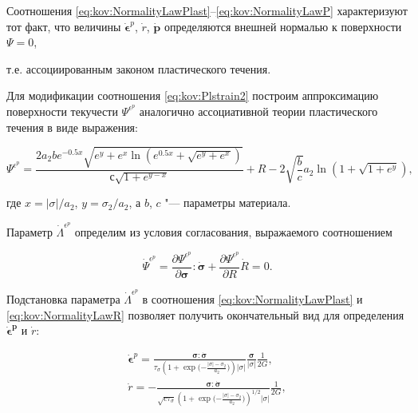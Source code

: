 Соотношения  \eqref{eq:kov:NormalityLawPlast}--\eqref{eq:kov:NormalityLawP} характеризуют тот факт, что величины $\boldsymbol{\dot{\epsilon}}^{p}$, $\dot{r}$, $\dot{\boldsymbol{p}}$  определяются внешней нормалью к поверхности $\Psi=0$,

т.е. ассоциированным законом пластического течения.



Для модификации соотношения \eqref{eq:kov:Plstrain2} построим аппроксимацию поверхности текучести $\Psi^{\epsilon^p}$ аналогично ассоциативной теории пластического течения \cite{kostina:bib:MurakamiB} в виде выражения:

$$

\Psi^{\epsilon^p}=\frac{2{a}_{2}b{e}^{-0.5x}\sqrt{{e}^{y}+{e}^{x}\ln \left({e}^{0.5x}+\sqrt{{e}^{y}+{e}^{x}} \right)}}{с\sqrt{1+{e}^{y-x}}}+R-2\sqrt{\frac{b}{c}}{a}_{2}\ln \left(1+\sqrt{1+{e}^{y}} \right), \label{eq:kov:Psiep}

$$

где $x= |  \sigma  |  /{a}_{2}$, $y=\sigma_{2}/{a}_{2}$, а $b$, $c$ "--- параметры материала.



Параметр $\dot{\Lambda}^{\epsilon^p}$ определим из условия согласования, выражаемого соотношением

$$

\dot{\Psi}^{\epsilon^p}=\frac{\partial{\Psi^{\epsilon^p}}}{\partial{\boldsymbol{\sigma}}}:\dot{\boldsymbol{\sigma}}+\frac{\partial \Psi^{\epsilon^p}}{\partial{R}}\dot{R}=0.

$$

Подстановка параметра $\dot{\Lambda}^{\epsilon^p}$ в соотношения \eqref{eq:kov:NormalityLawPlast} и \eqref{eq:kov:NormalityLawR} позволяет получить окончательный вид для определения $\boldsymbol{\dot{\epsilon}^{p}}$ и $\dot{r}$:

\begin{gather}

\boldsymbol{\dot{\epsilon}}^{p}= \frac{\boldsymbol{\sigma}:\dot{\boldsymbol{\sigma}}}

{\tau_{\sigma} \left(1+\exp\bigl({-\frac{ | \sigma | -\sigma_{2}}{a_{2}}}\bigr) \right) | \sigma | }

\frac{\boldsymbol{\sigma}}{ | \sigma | }\frac{1}{2G}, \label{eq:kov:Plstrain3}\\

\dot{r}=-\frac{\boldsymbol{\sigma}:\dot{\boldsymbol{\sigma}}}{\sqrt{c\tau_{\sigma}}

\left(1+\exp \bigl({-\frac{ | \sigma | -\sigma_{2}}{a_{2}}}\bigr)\right)^{1/2} | \sigma | }\frac{1}{2G}, \label{eq:kov:R}

\end{gather}

